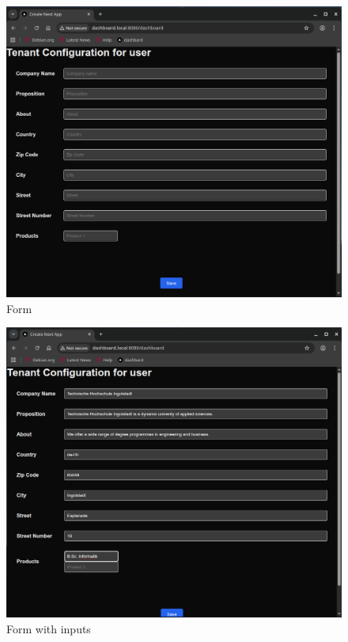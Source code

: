 \documentclass[11pt, a4paper, oneside, listof=totoc]{scrartcl}
\begin{document}
                \begin{figure}[h!]
                    \centering
                    \includegraphics[width=\textwidth]{screenshots/eval/dashboardfe/dashboardfe-form.png}
                    \caption{Form}\label{fig:dashboardfe-form}
                \end{figure}

                \begin{figure}[h!]
                    \centering
                    \includegraphics[width=\textwidth]{screenshots/eval/dashboardfe/dashboardfe-form-with-inputs.png}
                    \caption{Form with inputs}\label{fig:dashboardfe-form-with-inputs}
                \end{figure}
\end{document}
